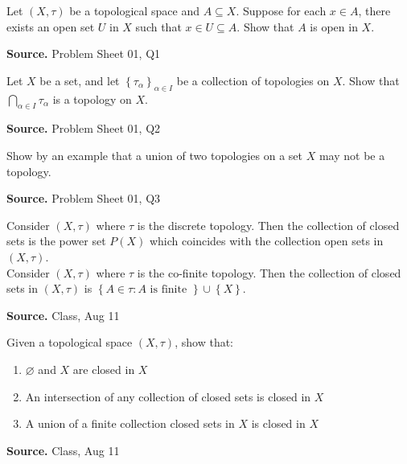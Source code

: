 \documentclass[12pt,twoside]{report}
\newenvironment*{source}{\hfill\scriptsize\textbf{Source.}\space}{\par}
\begin{document}
\begin{samepage}
\begin{ex}
Let $\left (X, \tau\right )$ be a topological space and $A \subseteq X$.
Suppose for each $x \in A$, there exists an open set $U$ in $X$ such that $x \in U \subseteq A$. Show that $A$ is open in $X$.
\end{ex}
\begin{source}
Problem Sheet 01, Q1
\end{source}
\end{samepage}

\begin{samepage}
\begin{ex}
Let $X$ be a set, and let $ \left\{ \tau_\alpha \right\}_{ \alpha \in I } $ be a collection of topologies on $X$. 
Show that $ \displaystyle\bigcap_{\alpha \in I} \tau_\alpha $ is a topology on $X$.
\end{ex}
\begin{source}
Problem Sheet 01, Q2
\end{source}
\end{samepage}

\begin{samepage}
\begin{ex}
Show by an example that a union of two topologies on a set $X$ may not be a topology.
\end{ex}
\begin{source}
Problem Sheet 01, Q3
\end{source}
\end{samepage}

\begin{samepage}
\begin{ex}
Consider $\left (X, \tau\right )$ where $\tau$ is the discrete topology. Then the collection of closed sets is the power set $P\left (X\right )$ which coincides with the collection open sets in $\left (X, \tau\right )$.\\
Consider $\left (X, \tau\right )$ where $\tau$ is the co-finite topology. Then the collection of closed sets in $\left (X, \tau\right )$ is $ \left\{ A \in \tau  :  A \text{ is finite } \right\} \cup \left\{ X \right\} $.
\end{ex}
\begin{source}
Class, Aug 11
\end{source}
\end{samepage}

\begin{samepage}
\begin{ex}
 Given a topological space $\left (X, \tau\right )$, show that:
    \begin{enumerate}
        \item $\varnothing$ and $X$ are closed in $X$
        \item An intersection of any collection of closed sets is closed in $X$
        \item A union of a finite collection closed sets in $X$ is closed in $X$
    \end{enumerate}
\end{ex}
\begin{source}
Class, Aug 11
\end{source}
\end{samepage}
\end{document}
